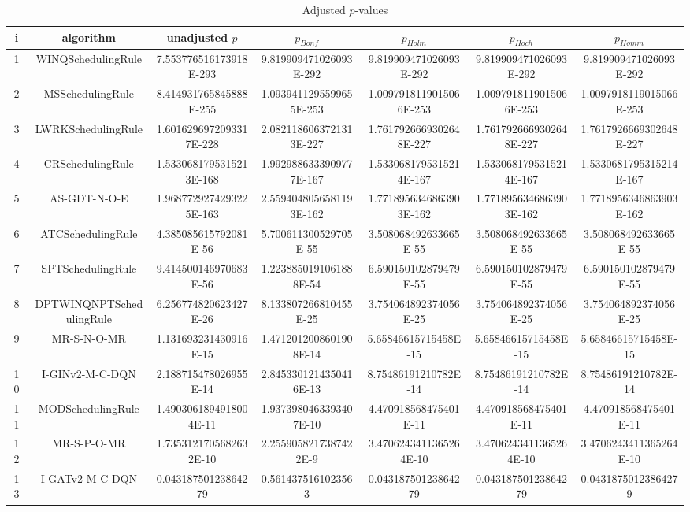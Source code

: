 \documentclass[a3paper,10pt]{article}
\begin{document}
\begin{table}[!htp]
\centering\tiny
\caption{Adjusted $p$-values}
\begin{tabular}{ccccccc}
i&algorithm&unadjusted $p$&$p_{Bonf}$&$p_{Holm}$&$p_{Hoch}$&$p_{Homm}$\\
\hline
1&WINQSchedulingRule&7.553776516173918E-293&9.819909471026093E-292&9.819909471026093E-292&9.819909471026093E-292&9.819909471026093E-292\\
2&MSSchedulingRule&8.414931765845888E-255&1.0939411295599655E-253&1.0097918119015066E-253&1.0097918119015066E-253&1.0097918119015066E-253\\
3&LWRKSchedulingRule&1.6016296972093317E-228&2.0821186063721313E-227&1.7617926669302648E-227&1.7617926669302648E-227&1.7617926669302648E-227\\
4&CRSchedulingRule&1.5330681795315213E-168&1.9929886333909777E-167&1.5330681795315214E-167&1.5330681795315214E-167&1.5330681795315214E-167\\
5&AS-GDT-N-O-E&1.9687729274293225E-163&2.5594048056581193E-162&1.7718956346863903E-162&1.7718956346863903E-162&1.7718956346863903E-162\\
6&ATCSchedulingRule&4.385085615792081E-56&5.700611300529705E-55&3.508068492633665E-55&3.508068492633665E-55&3.508068492633665E-55\\
7&SPTSchedulingRule&9.414500146970683E-56&1.2238850191061888E-54&6.590150102879479E-55&6.590150102879479E-55&6.590150102879479E-55\\
8&DPTWINQNPTSchedulingRule&6.256774820623427E-26&8.133807266810455E-25&3.754064892374056E-25&3.754064892374056E-25&3.754064892374056E-25\\
9&MR-S-N-O-MR&1.131693231430916E-15&1.4712012008601908E-14&5.65846615715458E-15&5.65846615715458E-15&5.65846615715458E-15\\
10&I-GINv2-M-C-DQN&2.188715478026955E-14&2.8453301214350416E-13&8.75486191210782E-14&8.75486191210782E-14&8.75486191210782E-14\\
11&MODSchedulingRule&1.4903061894918004E-11&1.9373980463393407E-10&4.470918568475401E-11&4.470918568475401E-11&4.470918568475401E-11\\
12&MR-S-P-O-MR&1.7353121705682632E-10&2.2559058217387422E-9&3.4706243411365264E-10&3.4706243411365264E-10&3.4706243411365264E-10\\
13&I-GATv2-M-C-DQN&0.04318750123864279&0.5614375161023563&0.04318750123864279&0.04318750123864279&0.04318750123864279\\
\hline
\end{tabular}
\end{table}
\end{document}
